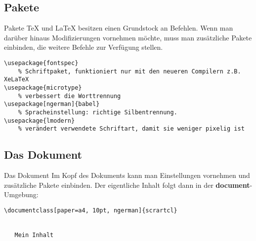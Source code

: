 \subsection{Pakete}
\begin{frame}[fragile]{Pakete}
\TeX{} und \LaTeX{} besitzen einen Grundstock an Befehlen. Wenn man darüber hinaus Modifizierungen vornehmen möchte, muss man zusätzliche Pakete einbinden, die weitere Befehle zur Verfügung stellen.\pause

\begin{lstlisting}[style=tex]
\usepackage{fontspec}
    % Schriftpaket, funktioniert nur mit den neueren Compilern z.B. XeLaTeX
\usepackage{microtype}
    % verbessert die Worttrennung
\usepackage[ngerman]{babel}
    % Spracheinstellung: richtige Silbentrennung.
\usepackage{lmodern}
    % verändert verwendete Schriftart, damit sie weniger pixelig ist
\end{lstlisting}
\end{frame}

\subsection{Das Dokument}
\begin{frame}[fragile]{Das Dokument}
Im Kopf des Dokuments kann man Einstellungen vornehmen und zusätzliche Pakete einbinden. Der eigentliche Inhalt folgt dann in der \textbf{document}-Umgebung:
\begin{lstlisting}[style=tex]
\documentclass[paper=a4, 10pt, ngerman]{scrartcl}


   Mein Inhalt
\end{lstlisting}
\end{frame}

